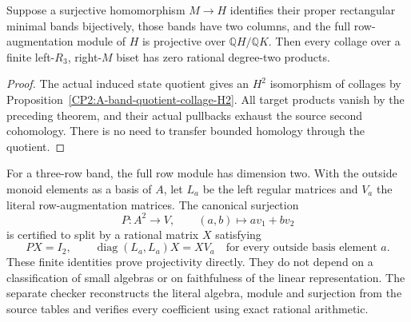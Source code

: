 \begin{corollary}
\label{CP2:A-projective-actor-image-cup-transfer}
Suppose a surjective homomorphism $M\to H$ identifies their proper
rectangular minimal bands bijectively, those bands have two columns,
and the full row-augmentation module of $H$ is projective over
$\mathbb QH/\mathbb QK$.
Then every collage over a finite left-$R_3$, right-$M$ biset has
zero rational degree-two products.
\end{corollary}
\begin{proof}
The actual induced state quotient gives an $H^2$ isomorphism of
collages by Proposition~\ref{CP2:A-band-quotient-collage-H2}.
All target products vanish by the preceding theorem, and their
actual pullbacks exhaust the source second cohomology.
There is no need to transfer bounded homology through the quotient.
\end{proof}

\begin{remark*}
For a three-row band, the full row module has dimension two.
With the outside monoid elements as a basis of $A$, let $L_a$
be the left regular matrices and $V_a$ the literal row-augmentation
matrices.  The canonical surjection
\[
 P:A^2\longrightarrow V,\qquad (a,b)\longmapsto a v_1+b v_2
\]
is certified to split by a rational matrix $X$ satisfying
\[
 PX=I_2,\qquad \operatorname{diag}(L_a,L_a)X=XV_a
 \quad\text{for every outside basis element }a.
\]
These finite identities prove projectivity directly.  They do not
depend on a classification of small algebras or on faithfulness of
the linear representation.  The separate checker reconstructs the
literal algebra, module and surjection from the source tables and
verifies every coefficient using exact rational arithmetic.
\end{remark*}
